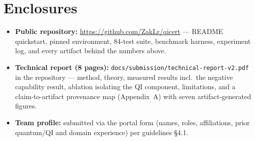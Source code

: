 \documentclass[10pt]{article}
\begin{document}
\section*{Enclosures}
\begin{itemize}
\item \textbf{Public repository:} \url{https://github.com/ZakLr/qicert}
--- README quickstart, pinned environment, 84-test suite, benchmark harness,
experiment log, and every artifact behind the numbers above.
\item \textbf{Technical report (8 pages):} \texttt{docs/submission/technical-report-v2.pdf}
in the repository --- method, theory, measured results incl.\ the negative
capability result, ablation isolating the QI component, limitations, and a
claim-to-artifact provenance map (Appendix~A) with seven artifact-generated
figures.
\item \textbf{Team profile:} submitted via the portal form (names, roles,
affiliations, prior quantum/QI and domain experience) per guidelines \S4.1.
\end{itemize}
\end{document}
